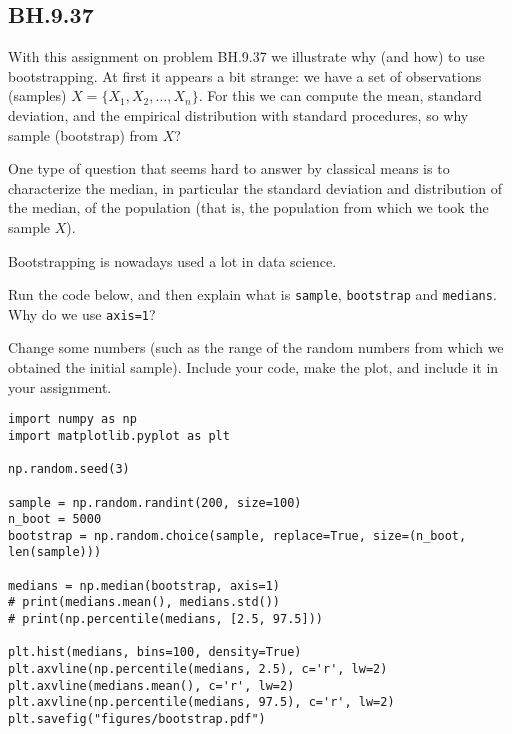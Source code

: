 
\subsection{BH.9.37}


With this assignment on problem BH.9.37 we illustrate why (and how) to use bootstrapping. At first it appears a bit strange: we have a set of observations (samples) $X=\{X_{1}, X_2, \ldots, X_{n}\}$. For this we can compute the mean, standard deviation, and the empirical distribution with standard procedures, so why sample (bootstrap) from $X$?

One type of question that seems hard to answer by classical means is to characterize the median, in particular the standard deviation and distribution of the median, of the population (that is, the population from which we took the sample $X$).

Bootstrapping is nowadays used a lot in data science.

\begin{exercise}
Run the code below, and then explain what is \texttt{sample}, \texttt{bootstrap} and \texttt{medians}. Why do we use \texttt{axis=1}?
\end{exercise}

\begin{exercise}
Change some numbers (such as the range of the random numbers from which we obtained the initial sample). Include your code,  make the plot, and include it in your assignment.
\end{exercise}

\begin{verbatim}
import numpy as np
import matplotlib.pyplot as plt

np.random.seed(3)

sample = np.random.randint(200, size=100)
n_boot = 5000
bootstrap = np.random.choice(sample, replace=True, size=(n_boot, len(sample)))

medians = np.median(bootstrap, axis=1)
# print(medians.mean(), medians.std())
# print(np.percentile(medians, [2.5, 97.5]))

plt.hist(medians, bins=100, density=True)
plt.axvline(np.percentile(medians, 2.5), c='r', lw=2)
plt.axvline(medians.mean(), c='r', lw=2)
plt.axvline(np.percentile(medians, 97.5), c='r', lw=2)
plt.savefig("figures/bootstrap.pdf")
\end{verbatim}

